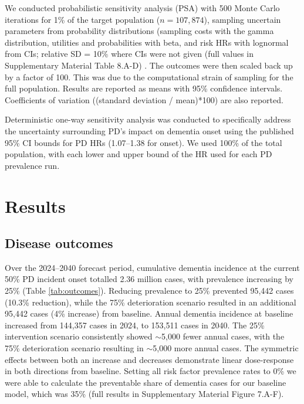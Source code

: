 \documentclass[11pt,a4paper]{article}
\begin{document}
We conducted probabilistic sensitivity analysis (PSA) with 500 Monte Carlo iterations for 1\% of the target population ($n = 107{,}874$), sampling uncertain parameters from probability distributions (sampling costs with the gamma distribution, utilities and probabilities with beta, and risk HRs with lognormal from CIs; relative SD = 10\% where CIs were not given (full values in Supplementary Material Table 8.A-D) \cite{ref40}. The outcomes were then scaled back up by a factor of 100. This was due to the computational strain of sampling for the full population. Results are reported as means with 95\% confidence intervals. Coefficients of variation ((standard deviation / mean)*100) are also reported.

Deterministic one-way sensitivity analysis was conducted to specifically address the uncertainty surrounding PD's impact on dementia onset using the published 95\% CI bounds for PD HRs (1.07--1.38 for onset). We used 100\% of the total population, with each lower and upper bound of the HR used for each PD prevalence run.

\section{Results}

\subsection{Disease outcomes}

Over the 2024--2040 forecast period, cumulative dementia incidence at the current 50\% PD incident onset totalled 2.36 million cases, with prevalence increasing by 25\% (Table \ref{tab:outcomes}). Reducing prevalence to 25\% prevented 95,442 cases (10.3\% reduction), while the 75\% deterioration scenario resulted in an additional 95,442 cases (4\% increase) from baseline. Annual dementia incidence at baseline increased from 144,357 cases in 2024, to 153,511 cases in 2040. The 25\% intervention scenario consistently showed $\sim$5,000 fewer annual cases, with the 75\% deterioration scenario resulting in $\sim$5,000 more annual cases. The symmetric effects between both an increase and decreases demonstrate linear dose-response in both directions from baseline. Setting all risk factor prevalence rates to 0\% we were able to calculate the preventable share of dementia cases for our baseline model, which was 35\% (full results in Supplementary Material Figure 7.A-F).
\end{document}
